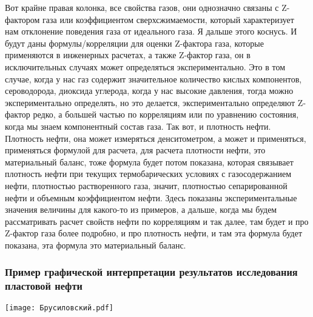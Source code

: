 \documentclass[main.tex]{subfiles}
\begin{document}
Вот крайне правая колонка, все свойства газов, они однозначно связаны с Z-фактором газа или коэффициентом сверхсжимаемости, который характеризует нам отклонение поведения газа от идеального газа.
Я дальше этого коснусь.
И будут даны формулы/корреляции для оценки Z-фактора газа, которые применяются в инженерных расчетах, а также Z-фактор газа, он в исключительных случаях может определяться экспериментально.
Это в том случае, когда у нас газ содержит значительное количество кислых компонентов, сероводорода, диоксида углерода, когда у нас высокие давления, тогда можно экспериментально определять, но это делается, экспериментально определяют Z-фактор редко, а большей частью по корреляциям или по уравнению состояния, когда мы знаем компонентный состав газа.
Так вот, и плотность нефти.
Плотность нефти, она может измеряться денситометром, а может и применяться, применяться формулой для расчета, для расчета плотности нефти, это материальный баланс, тоже формула будет потом показана, которая связывает плотность нефти при текущих термобарических условиях с газосодержанием нефти, плотностью растворенного газа, значит, плотностью сепарированной нефти и объемным коэффициентом нефти.
Здесь показаны экспериментальные значения величины для какого-то из примеров, а дальше, когда мы будем рассматривать расчет свойств нефти по корреляциям и так далее, там будет и про Z-фактор газа более подробно, и про плотность нефти, и там эта формула будет показана, эта формула это материальный баланс.

\subsubsection{Пример графической интерпретации результатов исследования пластовой нефти}

\begin{center}
\texttt{[image: Брусиловский.pdf]}
\end{center}
\end{document}
